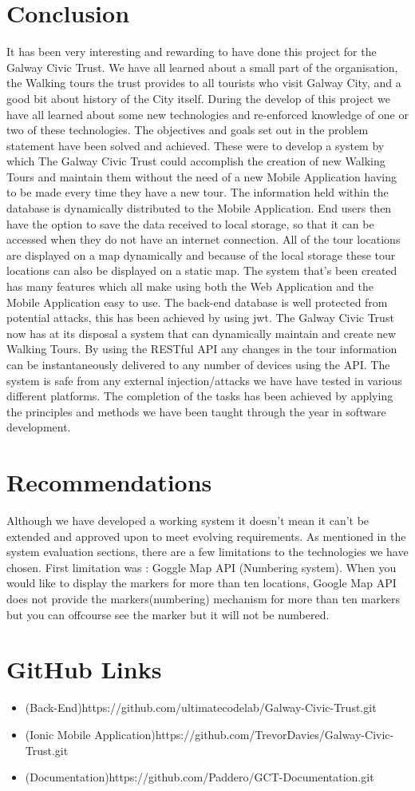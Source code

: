 \chapter{Conclusion}
It has been very interesting and rewarding to have done this project for the Galway Civic Trust. We have all learned about a small part of the organisation, the Walking tours the trust provides to all tourists who visit Galway City, and a good bit about history of the City itself.   
During the develop of this project we have all learned about some new technologies and re-enforced knowledge of one or two of these technologies.
The objectives and goals set out in the problem statement have been solved and achieved. These were to develop a system by which The Galway Civic Trust could accomplish the creation of new Walking Tours and maintain them without the need of a new Mobile Application having to be made every time they have a new tour.
The information held within the database is dynamically distributed to the Mobile Application. End users then have the option to save the data received to local storage, so that it can be accessed when they do not have an internet connection. All of the tour locations are displayed on a map dynamically and because of the local storage these tour locations can also be displayed on a static map. The system that's been created has many features which all make using both the Web Application and the Mobile Application easy to use. The back-end database is well protected from potential attacks, this has been achieved by using jwt.  
The Galway Civic Trust now has at its disposal a system that can dynamically maintain and create new Walking Tours. By using the RESTful API any changes in the tour information can be instantaneously delivered to any number of devices using the API. The system is safe from any external injection/attacks we have have tested in various different platforms.  
The completion of the tasks has been achieved by applying the principles and methods we have been taught through the year in software development.  



\chapter{Recommendations}
Although we have developed a working system it doesn't mean it can't be extended and approved upon to meet evolving requirements.
As mentioned in the system evaluation sections, there are a few limitations to the technologies we have chosen. 
First limitation was : Goggle Map API (Numbering system). When you would like to display the markers for more than ten locations, Google Map API does not provide the markers(numbering) mechanism for more than ten markers but you can offcourse see the marker but it will not be numbered. 



\chapter{GitHub Links}
\begin{itemize}
	\item{(Back-End)https://github.com/ultimatecodelab/Galway-Civic-Trust.git}
	\item{(Ionic Mobile Application)https://github.com/TrevorDavies/Galway-Civic-Trust.git}
	\item{(Documentation)https://github.com/Paddero/GCT-Documentation.git}
\end{itemize}
